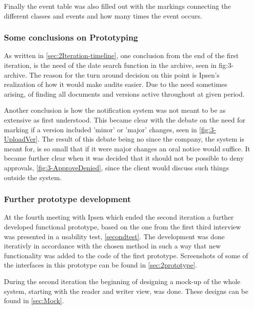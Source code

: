 Finally the event table was also filled out with the markings connecting the different classes and events and how many times the event occurs.

\subsubsection*{Some conclusions on Prototyping}
As written in \cref{sec:2Iteration-timeline}, one conclusion from the end of the first iteration, is the need of the date search function in the archive, seen in fig:3-archive.
The reason for the turn around decision on this point is Ipsen's realization of how it would make audits easier.
Due to the need sometimes arising, of finding all documents and versions active throughout at given period.

Another conclusion is how the notification system was not meant to be as extensive as first understood. 
This became clear with the debate on the need for marking if a version included 'minor' or 'major' changes, seen in \cref{fig:3-UploadVer}.
The result of this debate being no since the company, the system is meant for, is so small that if it were major changes an oral notice would suffice.
It became further clear when it was decided that it should not be possible to deny approvals, \cref{fig:3-ApproveDenied}, since the client would discuss such things outside the system.

\subsubsection*{Further prototype development}
At the fourth meeting with Ipsen which ended the second iteration a further developed functional prototype, based on the one from the first third interview was presented in a usability test, \cref{secondtest}.
The development was done iterativly in accordance with the chosen method in such a way that new functionality was added to the code of the first prototype.
Screenshots of some of the interfaces in this prototype can be found in \cref{sec:2prototype}.

During the second iteration the beginning of designing a mock-up of the whole system, starting with the reader and writer view, was done. 
These designs can be found in \cref{sec:Mock}.